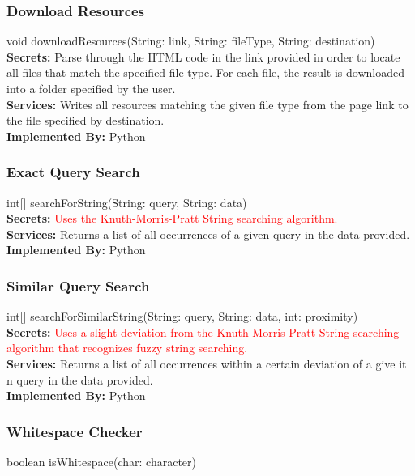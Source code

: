 \documentclass[titlepage]{article}
\begin{document}
\subsubsection{Download Resources}
void downloadResources(String: link, String: fileType, String: destination)\\

\textbf{Secrets:}
Parse through the HTML code in the link provided in order to locate all files that match the specified file type. For each file, the result is downloaded into a folder specified by the user.\\

\textbf{Services:}
Writes all resources matching the given file type from the page link to the file specified by destination.\\

\textbf{Implemented By:}
Python

\subsubsection{Exact Query Search}
int[] searchForString(String: query, String: data)\\

\textbf{Secrets:}
\textcolor{red}{Uses the Knuth-Morris-Pratt String searching algorithm.}\\

\textbf{Services:}
Returns a list of all occurrences of a given query in the data provided.\\

\textbf{Implemented By:}
Python


\subsubsection{Similar Query Search}
int[] searchForSimilarString(String: query, String: data, int: proximity)\\

\textbf{Secrets:}
\textcolor{red}{Uses a slight deviation from the Knuth-Morris-Pratt String searching algorithm that recognizes fuzzy string searching.}\\

\textbf{Services:}
Returns a list of all occurrences within a certain deviation of a give it n query in the data provided.\\

\textbf{Implemented By:}
Python

\subsubsection{Whitespace Checker}
boolean isWhitespace(char: character)\\
\end{document}
